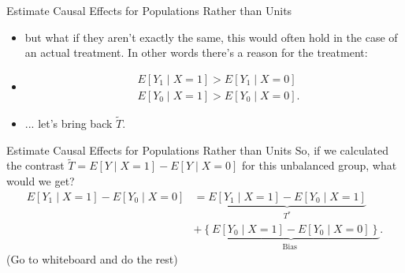\documentclass{beamer}
\begin{document}
\begin{frame}{Estimate Causal Effects for Populations Rather than Units}
  \begin{itemize}
    \item<+-> but what if they aren't exactly the same, this would often hold in the case of an actual treatment. In other words there's a reason for the treatment:
    \item<+-> $$
    \begin{aligned}
    & E\left[Y_1 \mid X=1\right]>E\left[Y_1 \mid X=0\right] \\
    & E\left[Y_0 \mid X=1\right]>E\left[Y_0 \mid X=0\right] .
    \end{aligned}
    $$
    \item<+-> ... let's bring back $\tilde{T}$. 
  \end{itemize}
\end{frame}

\begin{frame}{Estimate Causal Effects for Populations Rather than Units}
  So, if we calculated the contrast $\tilde{T}=E[Y \mid X=1]-E[Y \mid X=0]$ for this unbalanced group, what would we get?
  $$
  \begin{aligned}
  E\left[Y_1 \mid X=1\right]-E\left[Y_0 \mid X=0\right] & =\underbrace{E\left[Y_1 \mid X=1\right]-E\left[Y_0 \mid X=1\right]}_{T^*} \\
  & +\underbrace{\left\{E\left[Y_0 \mid X=1\right]-E\left[Y_0 \mid X=0\right]\right\}}_{\text {Bias }} .
  \end{aligned}
  $$
  (Go to whiteboard and do the rest)
\end{frame}

\end{document}

